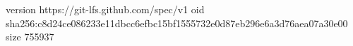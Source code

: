 version https://git-lfs.github.com/spec/v1
oid sha256:c8d24ce086233e11dbcc6efbc15bf1555732e0d87eb296e6a3d76aea07a30e00
size 755937
